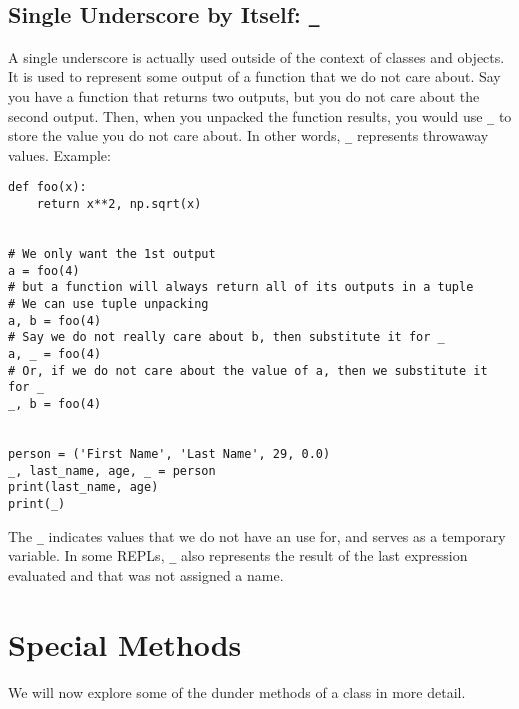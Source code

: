 \documentclass[12pt, a4paper]{article}
\begin{document}
\subsection{Single Underscore by Itself: \texttt{\_}}
\label{sec:org20ba0c5}
A single underscore is actually used outside of the context of classes and objects.
It is used to represent some output of a function that we do not care about.
Say you have a function that returns two outputs, but you do not care about the second output.
Then, when you unpacked the function results, you would use \texttt{\_} to store the value you do not care about.
In other words, \texttt{\_} represents throwaway values.
Example:
\lstset{language=jupyter-python,label= ,caption= ,captionpos=b,numbers=none}
\begin{lstlisting}
def foo(x):
    return x**2, np.sqrt(x)


# We only want the 1st output
a = foo(4)
# but a function will always return all of its outputs in a tuple
# We can use tuple unpacking
a, b = foo(4)
# Say we do not really care about b, then substitute it for _
a, _ = foo(4)
# Or, if we do not care about the value of a, then we substitute it for _
_, b = foo(4)


person = ('First Name', 'Last Name', 29, 0.0)
_, last_name, age, _ = person
print(last_name, age)
print(_)
\end{lstlisting}
The \texttt{\_} indicates values that we do not have an use for, and serves as a temporary variable.
In some REPLs, \texttt{\_} also represents the result of the last expression evaluated and that was not assigned a name.
\section{Special Methods}
\label{sec:org56c148b}
We will now explore some of the dunder methods of a class in more detail.
\end{document}
